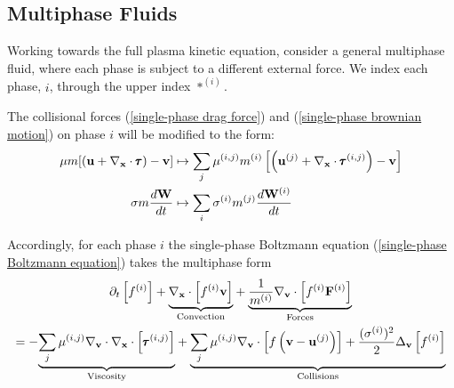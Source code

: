 \subsection{Multiphase Fluids}

    Working towards the full plasma kinetic equation, consider a general multiphase fluid, where each phase is subject to a different external force. We index each phase, $i$, through the upper index $*^{(i)}$.

    The collisional forces (\ref{single-phase drag force}) and (\ref{single-phase brownian motion}) on phase $i$ will be modified to the form:  
    \begin{align}
        \mu m[(\mathbf{u} + \nabla_{\mathbf{x}}\cdot\pmb{\mathsf{\tau}}) - \mathbf{v}]  &\mapsto  \sum_{j}\mu^{(i, j)}m^{(i)}\left[\left(\mathbf{u}^{(j)} + \nabla_{\mathbf{x}}\cdot\pmb{\mathsf{\tau}}^{(i, j)}\right) - \mathbf{v}\right]  \\
        \sigma m\frac{d\mathbf{W}}{dt}  &\mapsto  \sum_{i}\sigma^{(i)}m^{(j)}\frac{d\mathbf{W}^{(i)}}{dt}
    \end{align}

    Accordingly, for each phase $i$ the single-phase Boltzmann equation (\ref{single-phase Boltzmann equation}) takes the multiphase form
    \begin{multline}\label{multiphase Boltzmann equation}
        \partial_{t}\left[f^{(i)}\right] + \underset{\textrm{Convection}}{\underbrace{\nabla_{\mathbf{x}}\cdot\left[f^{(i)}\mathbf{v}\right]}} + \underset{\textrm{Forces}}{\underbrace{\frac{1}{m^{(i)}}\nabla_{\mathbf{v}}\cdot\left[f^{(i)}\mathbf{F}^{(i)}\right]}}  \\  =  - \underset{\textrm{Viscosity}}{\underbrace{\sum_{j}\mu^{(i, j)}\nabla_{\mathbf{v}}\cdot\nabla_{\mathbf{x}}\cdot\left[\pmb{\mathsf{\tau}}^{(i, j)}\right]}} + \underset{\textrm{Collisions}}{\underbrace{\sum_{j}\mu^{(i, j)}\nabla_{\mathbf{v}}\cdot\left[f\left(\mathbf{v} - \mathbf{u}^{(j)}\right)\right] + \frac{(\sigma^{(i)})^{2}}{2}\Delta_{\mathbf{v}}\left[f^{(i)}\right]}}
    \end{multline}